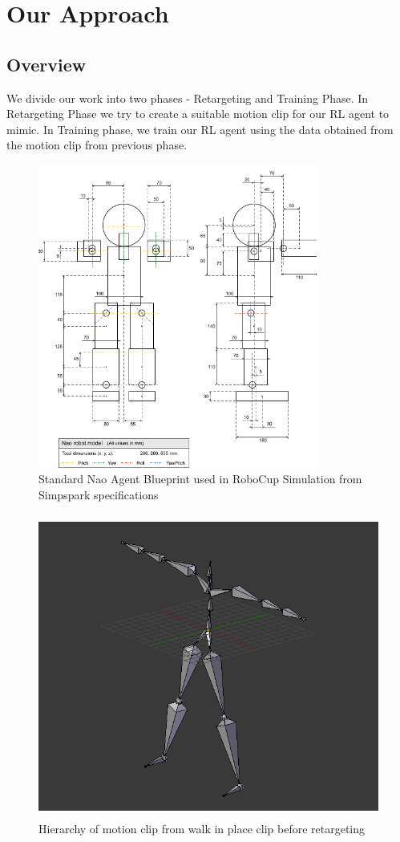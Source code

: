 \chapter{Our Approach}

\section{Overview}
We divide our work into two phases - Retargeting and Training Phase.
In Retargeting Phase we try to create a suitable motion clip for our RL agent to mimic.
In Training phase, we train our RL agent using the data obtained from the motion clip from previous phase.
\begin{figure}
\centering
  \includegraphics[width=0.7\linewidth, height=10cm,keepaspectratio]{images/nao_param.png}
  \caption{Standard Nao Agent Blueprint used in RoboCup Simulation from Simpspark specifications}
  \label{fig:nao_params}
\end{figure}

\begin{figure}
\centering
  \includegraphics[width=0.7\linewidth, height=10cm,keepaspectratio]{images/mocap_hierarchy.png}
  \caption{Hierarchy of motion clip from walk in place clip before retargeting}
  \label{fig:mocap_hierarchy}
\end{figure}

